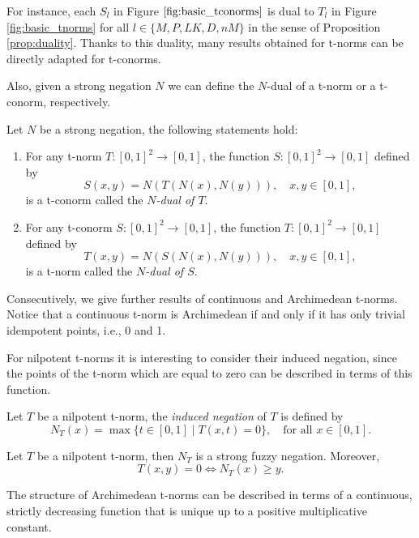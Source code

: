 For instance, each $S_l$ in Figure $\ref{fig:basic_tconorms}$ is dual to $T_l$ in Figure \ref{fig:basic_tnorms} for all $l \in \{M,P,LK,D,nM\}$ in the sense of Proposition \ref{prop:duality}. Thanks to this duality, many results obtained for t-norms can be directly adapted for t-conorms.

Also, given a strong negation $N$ we can define the $N$-dual of a t-norm or a t-conorm, respectively.

\begin{proposition}\label{prop:N_dual} Let $N$ be a strong negation, the following statements hold:
	\begin{enumerate}[label=(\roman*)]
		\item For any t-norm $T:[0,1]^2 \to [0,1]$, the function $S: [0,1]^2 \to [0,1]$ defined by
		$$S(x,y)=N(T(N(x),N(y))), \quad x,y \in [0,1],$$
		is a t-conorm called the \emph{$N$-dual of $T$}.
		\item For any t-conorm $S:[0,1]^2 \to [0,1]$, the function $T: [0,1]^2 \to [0,1]$ defined by
		$$T(x,y)=N(S(N(x),N(y))), \quad x,y \in [0,1],$$
		is a t-norm called the \emph{$N$-dual of $S$}.
	\end{enumerate}
\end{proposition}

Consecutively, we give further results of continuous and Archimedean t-norms. Notice that a continuous t-norm is Archimedean if and only if it has only trivial idempotent points, i.e., 0 and 1.

For nilpotent t-norms it is interesting to consider their induced negation, since the points of the t-norm which are equal to zero can be described in terms of this function.

\begin{definition}
	Let $T$ be a nilpotent t-norm, the \emph{induced negation} of $T$ is defined by
	$$N_T(x) = \max \{t \in [0,1] \mid T(x,t)=0\}, \quad \text{for all } x \in [0,1].$$
\end{definition}

\begin{proposition}\label{prop:NTinvolutive}
	Let $T$ be a nilpotent t-norm, then $N_T$ is a strong fuzzy negation. Moreover,
	$$T(x,y)=0 \Leftrightarrow N_T(x) \geq y.$$
\end{proposition}

The structure of Archimedean t-norms can be described in terms of a continuous, strictly decreasing function that is unique up to a positive multiplicative constant.

